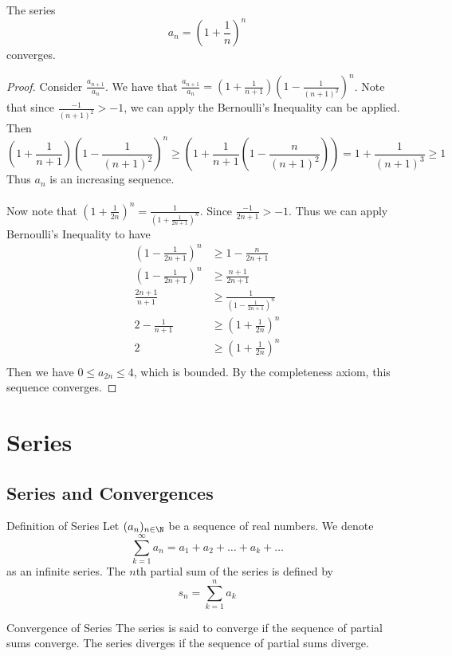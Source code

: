 \begin{crl}{}{} The series $$a_n=\left(1+\frac{1}{n}\right)^n$$ converges. \tcbline
\begin{proof} Consider $\frac{a_{n+1}}{a_n}$. We have that $\frac{a_{n+1}}{a_n}=\left(1+\frac{1}{n+1}\right)\left(1-\frac{1}{(n+1)^2}\right)^n$. Note that since $\frac{-1}{(n+1)^2}>-1$, we can apply the Bernoulli's Inequality can be applied. Then $$\left(1+\frac{1}{n+1}\right)\left(1-\frac{1}{(n+1)^2}\right)^n\geq\left(1+\frac{1}{n+1}\left(1-\frac{n}{(n+1)^2}\right)\right)=1+\frac{1}{(n+1)^3}\geq 1$$ Thus $a_n$ is an increasing sequence. 
\\~\\ Now note that $\left(1+\frac{1}{2n}\right)^n=\frac{1}{\left(1+\frac{1}{2n+1}\right)^n}$. Since $\frac{-1}{2n+1}>-1$. Thus we can apply Bernoulli's Inequality to have 
\begin{align*}
\left(1-\frac{1}{2n+1}\right)^n&\geq1-\frac{n}{2n+1} \\
\left(1-\frac{1}{2n+1}\right)^n&\geq\frac{n+1}{2n+1} \\
\frac{2n+1}{n+1}&\geq\frac{1}{\left(1-\frac{1}{2n+1}\right)^n} \\
2-\frac{1}{n+1}&\geq\left(1+\frac{1}{2n}\right)^n \\
2&\geq\left(1+\frac{1}{2n}\right)^n \\
\end{align*}
Then we have $0\leq a_{2n}\leq 4$, which is bounded. By the completeness axiom, this sequence converges. 
\end{proof}
\end{crl}

\pagebreak
\section{Series}
\subsection{Series and Convergences}
\begin{defn}{Definition of Series}{} Let $(a_n)_{n\in\N}$ be a sequence of real numbers. We denote $$\sum_{k=1}^{\infty}a_n=a_1+a_2+\dots+a_k+\dots$$ as an infinite series. The $n$th partial sum of the series is defined by $$s_n=\sum_{k=1}^{n}a_k$$
\end{defn} 

\begin{defn}{Convergence of Series}{} The series is said to converge if the sequence of partial sums converge. The series diverges if the sequence of partial sums diverge. 
\end{defn}

